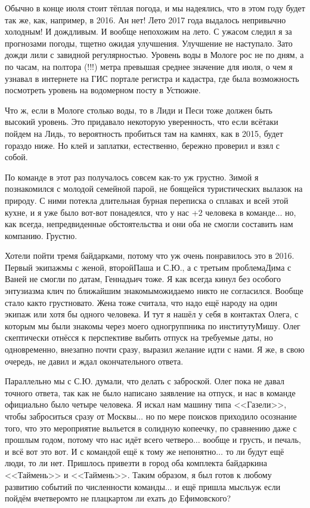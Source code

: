 Обычно в конце июля стоит тёплая погода, и мы надеялись, что в этом году будет так же, как, например, в 2016. Ан нет! Лето 2017 года выдалось непривычно холодным! И дождливым. И вообще непохожим на лето. С ужасом следил я за прогнозами погоды, тщетно ожидая улучшения. Улучшение не наступало. Зато дожди лили с завидной регулярностью. Уровень воды в Мологе рос не по дням, а по часам, на полтора (!!!) метра превышая среднее значение для июля, о чем я узнавал в интернете на ГИС портале регистра и кадастра, где была возможность посмотреть уровень на водомерном посту в Устюжне. 

Что ж, если в Мологе столько воды, то в Лиди и Песи тоже должен быть высокий уровень. Это придавало некоторую уверенность, что если всё\sdash таки пойдем на Лидь, то вероятность пробиться там на камнях, как в 2015, будет гораздо ниже. Но клей и заплатки, естественно, бережно проверил и взял с собой.

По команде в этот раз получалось совсем как-то уж грустно. Зимой я познакомился с молодой семейной парой, не боящейся туристических вылазок на природу. С ними потекла длительная бурная переписка о сплавах и всей этой кухне, и я уже было вот-вот понадеялся, что у нас +2 человека в команде$\ldots$ но, как всегда, непредвиденные обстоятельства и они оба не смогли составить нам компанию. Грустно. 

Хотели пойти тремя байдарками, потому что уж очень понравилось это в 2016. Первый экипаж\mdash мы с женой, второй\mdash Паша и С.Ю., а с третьим проблема\mdash Дима с Ваней не смогли по датам, Геннадьич тоже. Я как всегда кинул без особого энтузиазма клич по ближайшим знакомым\mdash ожидаемо никто не согласился. Вообще стало как\sdash то грустновато. Жена тоже считала, что надо ещё народу на один экипаж или хотя бы одного человека. И тут я нашёл у себя в контактах Олега, с которым мы были знакомы через моего одногруппника по институту\mdash Мишу. Олег скептически отнёсся к перспективе выбить отпуск на требуемые даты, но одновременно, внезапно почти сразу, выразил желание идти с нами. Я же, в свою очередь, не давил и ждал окончательного ответа. 

Параллельно мы с С.Ю. думали, что делать с заброской. Олег пока не давал точного ответа, так как не было написано заявление на отпуск, и нас в команде официально было четыре человека. Я искал нам машину типа <<Газели>>, чтобы заброситься сразу от Москвы$\ldots$ но по мере поисков приходило осознание того, что это мероприятие выльется в солидную копеечку, по сравнению даже с прошлым годом, потому что нас идёт всего четверо$\ldots$ вообще и грусть, и печаль, и всё вот это вот. И с командой ещё к тому же непонятно$\ldots$ то ли будут ещё люди, то ли нет. Пришлось привезти в город оба комплекта байдарки\mdash на <<Таймень>> и <<Таймень>>. Таким образом, я был готов к любому развитию событий по численности команды$\ldots$ и ещё пришла мысль\mdash уж если пойдём вчетвером\mdash то не плацкартом ли ехать до Ефимовского?

